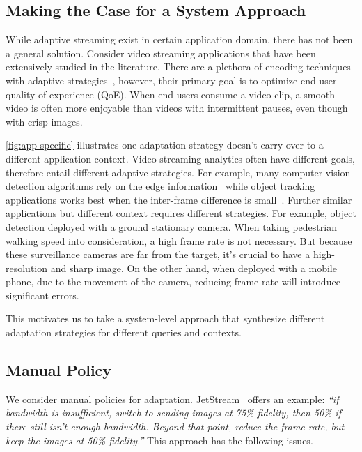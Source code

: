 \subsection{Making the Case for a System Approach}
\label{sec:bat}

While adaptive streaming exist in certain application domain, there has not been
a general solution. Consider video streaming applications that have been
extensively studied in the literature. There are a plethora of encoding
techniques~\cite{richardson2011h, grange2016vp9} with adaptive
strategies~\cite{yin2015control, michalos2012dynamic, pantos2016http}, however,
their primary goal is to optimize end-user quality of experience (QoE).  When
end users consume a video clip, a smooth video is often more enjoyable than
videos with intermittent pauses, even though with crisp images.

\autoref{fig:app-specific} illustrates one adaptation strategy doesn't carry
over to a different application context. Video streaming analytics often have
different goals, therefore entail different adaptive strategies. For example,
many computer vision detection algorithms rely on the edge
information~\cite{canny1986computational, lowe2004distinctive, viola2001rapid}
while object tracking applications works best when the inter-frame difference is
small~\cite{allen2004object}. Further similar applications but different context
requires different strategies. For example, object detection deployed with a
ground stationary camera. When taking pedestrian walking speed into
consideration, a high frame rate is not necessary. But because these
surveillance cameras are far from the target, it's crucial to have a
high-resolution and sharp image. On the other hand, when deployed with a mobile
phone, due to the movement of the camera, reducing frame rate will introduce
significant errors.

This motivates us to take a system-level approach that synthesize different
adaptation strategies for different queries and contexts.

\subsection{Manual Policy}
\label{sec:manual-policy}

We consider manual policies for
adaptation. JetStream~\cite{rabkin2014aggregation} offers an example:
\textit{``if bandwidth is insufficient, switch to sending images at 75\%
  fidelity, then 50\% if there still isn't enough bandwidth. Beyond that point,
  reduce the frame rate, but keep the images at 50\% fidelity.''} This approach
has the following issues.

